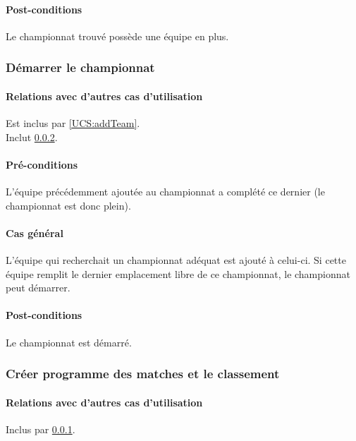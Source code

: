 \paragraph{Post-conditions}
\begin{list}{}{\leftmargin=1.5em}
\item{Le championnat trouvé possède une équipe en plus.}
\end{list}

\subsubsection{Démarrer le championnat}
\label{UCS:startChampionship}
\paragraph{Relations avec d'autres cas d'utilisation}
Est inclus par \ref{UCS:addTeam}.\\
Inclut \ref{UCS:createST}.
\paragraph{Pré-conditions}
\begin{list}{}{\leftmargin=1.5em}
\item{L'équipe précédemment ajoutée au championnat a complété ce dernier (le championnat est donc plein).}
\end{list}
\paragraph{Cas général}
L'équipe qui recherchait un championnat adéquat est ajouté à celui-ci. Si cette équipe remplit le dernier emplacement libre de ce championnat, le championnat peut démarrer.
\paragraph{Post-conditions}
\begin{list}{}{\leftmargin=1.5em}
\item{Le championnat est démarré.}
\end{list}

\subsubsection{Créer programme des matches et le classement}
\label{UCS:createST}
\paragraph{Relations avec d'autres cas d'utilisation}
Inclus par \ref{UCS:startChampionship}.
